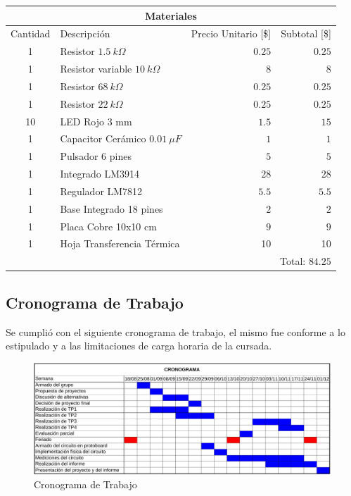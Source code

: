\documentclass[12pt,a4paper]{article}
\begin{document}
		\begin{center}
			
			{\footnotesize \begin{tabular}{ |c|l|r|r| }

			\hline
				\multicolumn{4}{|c|}{\textbf{Materiales}}\\ \hline
				Cantidad & Descripción & Precio Unitario [\$] & Subtotal [\$] \\ \hline
				1 & Resistor $1.5 \: k\Omega$ & $0.25$ & $0.25$\\ \hline
				1 & Resistor variable $10 \: k\Omega$ & $8$& $8$ \\ \hline
				1 & Resistor $68 \: k\Omega$ & $0.25$&$0.25$ \\ \hline
				1 & Resistor $22 \: k\Omega$ & $0.25$& $0.25$\\ \hline
				10 & LED Rojo 3 mm & $1.5$ & $15$\\ \hline
				1 & Capacitor Cerámico $0.01 \: \mu F$ & $1$& $1$\\ \hline
				1 & Pulsador 6 pines & $5$ & $5$ \\ \hline
				1 & Integrado LM3914 & $28$ & $28$\\ \hline
				1 & Regulador LM7812 & $5.5$& $5.5$ \\ \hline
				1 & Base Integrado 18 pines & $2$& $2$ \\ \hline
				1 & Placa Cobre 10x10 cm & $9$& $9$ \\ \hline
				1 & Hoja Transferencia Térmica & 10 & 10\\ \hline
				\multicolumn{4}{|r|}{Total:  $84.25$}\\ \hline


			\end{tabular}}\label{tab:costo}
			\end{center}

			\subsection{Cronograma de Trabajo}
				Se cumplió con el siguiente cronograma de trabajo, el mismo fue conforme a lo estipulado y a las limitaciones de carga horaria de la cursada.
				\begin{figure}[H]
					\centering
					\includegraphics[scale=0.8]{images/Cronograma.pdf}\caption{Cronograma de Trabajo}
					\end{figure}
\end{document}
